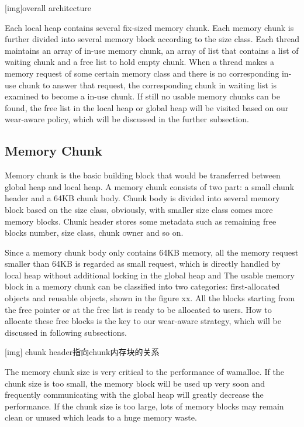 \documentclass{vldb}
\begin{document}
[img]overall architecture

Each local heap contains several fix-sized memory chunk. Each memory chunk is further divided into several memory block according to the size class. Each thread maintains an array of in-use memory chunk, an array of list that contains a list of waiting chunk and a free list to hold empty chunk. When a thread makes a memory request of some certain memory class and there is no corresponding in-use chunk to answer that request, the corresponding chunk in waiting list is examined to become a in-use chunk. If still no usable memory chunks can be found, the free list in the local heap or global heap will be visited based on our wear-aware policy, which will be discussed in the further subsection.

\subsection{Memory Chunk}

Memory chunk is the basic building block that would be transferred between global heap and local heap. A memory chunk consists of two part: a small chunk header and a 64KB chunk body. Chunk body is divided into several memory block based on the size class, obviously, with smaller size class comes more memory blocks. Chunk header stores some metadata such as remaining free blocks number, size class, chunk owner and so on.

Since a memory chunk body only contains 64KB memory, all the memory request smaller than 64KB is regarded as small request,
which is directly handled by local heap without additional locking in the global heap and 
The usable memory block in a memory chunk can be classified into two categories: first-allocated objects and reusable objects,
shown in the figure xx. 
All the blocks starting from the free pointer or at the free list is ready to be allocated to users.
How to allocate these free blocks is the key to our wear-aware strategy, which will be discussed in following subsections.

[img] chunk header指向chunk内存块的关系

The memory chunk size is very critical to the performance of wamalloc. 
If the chunk size is too small, the memory block will be used up very soon and frequently communicating with the global heap will greatly decrease the performance.
If the chunk size is too large, lots of memory blocks may remain clean or unused which leads to a huge memory waste.
\end{document}
